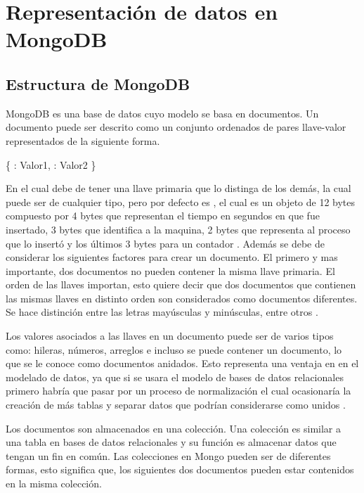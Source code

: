 \documentclass[conference,compsoc]{sty/IEEEtran}
\begin{document}
\section{Representación de datos en MongoDB}


\subsection{Estructura de MongoDB}

MongoDB es una base de datos cuyo modelo se basa en documentos. Un documento puede ser descrito como un conjunto ordenados de pares llave-valor representados de la siguiente forma.

    \{  : Valor1,  : Valor2 \}

En el cual debe de tener una llave primaria  que lo distinga de los demás, la cual puede ser de cualquier tipo, pero por defecto es , el cual es un objeto de 12 bytes compuesto por 4 bytes que representan el tiempo en segundos en que fue insertado, 3 bytes que identifica a la maquina, 2 bytes que representa al proceso que lo insertó y los últimos 3 bytes para un contador \cite{ObjectId}. Además se debe de considerar los siguientes factores para crear un documento. El primero y mas importante, dos documentos no pueden contener la misma llave primaria. El orden de las llaves importan, esto quiere decir que dos documentos que contienen las mismas llaves en distinto orden son considerados como documentos diferentes. Se hace distinción entre las letras mayúsculas y minúsculas, entre otros \cite{Chodorow}.

Los valores asociados a las llaves en un documento puede ser de varios tipos como: hileras, números, arreglos e incluso se puede contener un documento, lo que se le conoce como documentos anidados.  Esto representa una ventaja en en el modelado de datos, ya que si se usara el modelo de bases de datos relacionales primero habría que pasar por un proceso de normalización el cual ocasionaría la creación de más tablas y separar datos que podrían considerarse como unidos \cite{Chodorow}.

Los documentos son almacenados en una colección. Una colección es similar a una tabla en bases de datos relacionales y su función es almacenar datos que tengan un fin en común. Las colecciones en Mongo pueden ser de diferentes formas, esto significa que, los siguientes dos documentos pueden estar contenidos en la misma colección.
\end{document}
